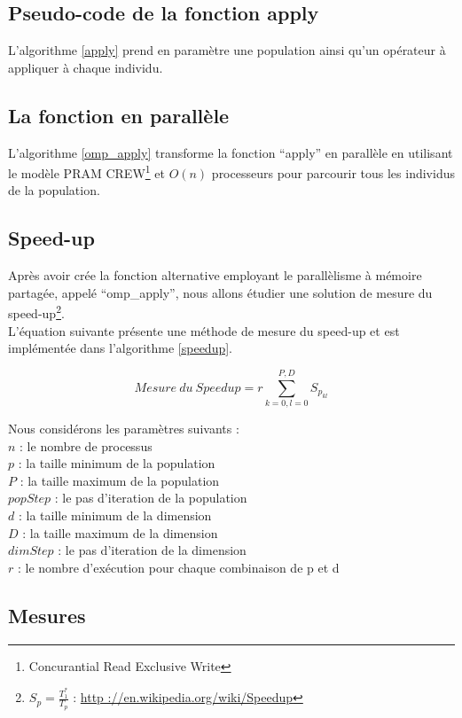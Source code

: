 \documentclass[oneside,11pt]{article}
\begin{document}
\begin{empfile}
\subsection{Pseudo-code de la fonction apply}

L'algorithme \ref{apply} prend en paramètre une population ainsi qu'un opérateur à appliquer à chaque individu.

\subsection{La fonction en parallèle}

L'algorithme \ref{omp_apply} transforme la fonction ``apply'' en parallèle en utilisant le modèle PRAM CREW\footnote{Concurantial Read Exclusive Write} et $O(n)$ processeurs pour parcourir tous les individus de la population.

\subsection{Speed-up}

Après avoir crée la fonction alternative employant le parallèlisme à mémoire partagée, appelé ``omp\_apply'', nous allons étudier une solution de mesure du speed-up\footnote{$S_p = \frac{T_1^*}{T_p}$ : \url{http ://en.wikipedia.org/wiki/Speedup}}.\\

L'équation suivante présente une méthode de mesure du speed-up et est implémentée dans l'algorithme \ref{speedup}.

$$Mesure\ du\ Speedup = r \sum^{P,D}_{k=0,l=0} S_{p_{kl}}$$

Nous considérons les paramètres suivants :\\
$n$ : le nombre de processus\\
$p$ : la taille minimum de la population\\
$P$ : la taille maximum de la population\\
$popStep$ : le pas d'iteration de la population\\
$d$ : la taille minimum de la dimension\\
$D$ : la taille maximum de la dimension\\
$dimStep$ : le pas d'iteration de la dimension\\
$r$ : le nombre d'exécution pour chaque combinaison de p et d\\

\subsection{Mesures}


\end{empfile}
\end{document}
